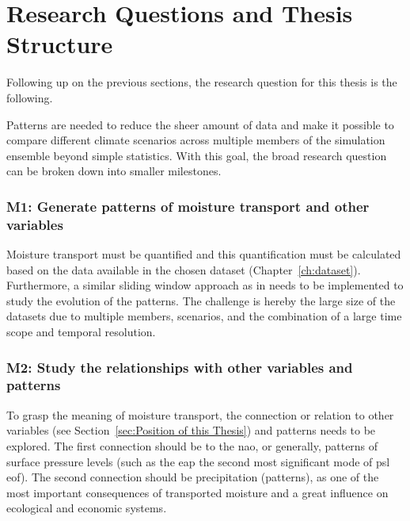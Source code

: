 \section{Research Questions and Thesis Structure}
\label{sec:research_questions}

Following up on the previous sections, the research question for this thesis is the following. 

\begin{center}
\end{center}

Patterns are needed to reduce the sheer amount of data and make it possible to compare different climate scenarios across multiple members of the simulation ensemble beyond simple statistics.
With this goal, the broad research question can be broken down into smaller milestones. 

\subsubsection{M1: Generate patterns of moisture transport and other variables}

Moisture transport must be quantified and this quantification must be calculated based on the data available in the chosen dataset (Chapter~\ref{ch:dataset}). 
Furthermore, a similar sliding window approach as in \cite{vietinghoff_visual_2021} needs to be implemented to study the evolution of the patterns.
The challenge is hereby the large size of the datasets due to multiple members, scenarios, and the combination of a large time scope and temporal resolution. 

\subsubsection{M2: Study the relationships with other variables and patterns}

To grasp the meaning of moisture transport, the connection or relation to other variables (see Section~\ref{sec:Position of this Thesis}) and patterns needs to be explored. 
The first connection should be to the \ac{nao}, or generally, patterns of surface pressure levels (such as the \ac{eap} the second most significant mode of \ac{psl} \ac{eof}). 
The second connection should be precipitation (patterns), as one of the most important consequences of transported moisture and a great influence on ecological and economic systems. 


